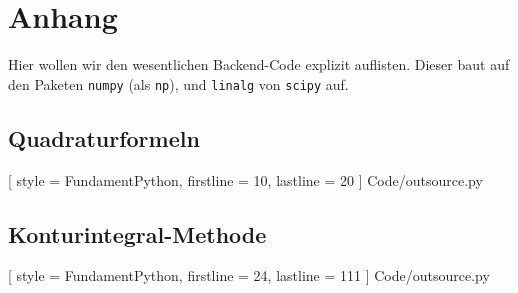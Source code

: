 \chapter{Anhang}

Hier wollen wir den wesentlichen Backend-Code explizit auflisten.
Dieser baut auf den Paketen \texttt{numpy} (als \texttt{np}), und \texttt{linalg} von \texttt{scipy} auf.

\section{Quadraturformeln}


[
    style = FundamentPython,
    firstline = 10,
    lastline = 20
]
{Code/outsource.py}

\section{Konturintegral-Methode}


[
    style = FundamentPython,
    firstline = 24,
    lastline = 111
]
{Code/outsource.py}
